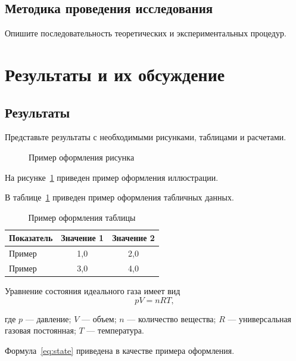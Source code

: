 \documentclass[a4paper,14pt]{extarticle}
\begin{document}
\subsection{Методика проведения исследования}
Опишите последовательность теоретических и экспериментальных процедур.

\clearpage\section{Результаты и их обсуждение}
\subsection{Результаты}
Представьте результаты с необходимыми рисунками, таблицами и расчетами.

\begin{figure}[htbp]
  \centering
  \fbox{\rule{0pt}{3cm}\rule{8cm}{0pt}}
  \caption{Пример оформления рисунка}
  \label{fig:example}
\end{figure}

На рисунке~\ref{fig:example} приведен пример оформления иллюстрации.

В таблице~\ref{tab:example} приведен пример оформления табличных данных.

\begin{table}[htbp]
  \caption{Пример оформления таблицы}
  \label{tab:example}
  \begin{tabular}{@{}lcc@{}}
    \toprule
    Показатель & Значение 1 & Значение 2 \\
    \midrule
    Пример & 1,0 & 2,0 \\
    Пример & 3,0 & 4,0 \\
    \bottomrule
  \end{tabular}
\end{table}

Уравнение состояния идеального газа имеет вид
\begin{equation}
  pV = nRT,
  \label{eq:state}
\end{equation}

где $p$ — давление; $V$ — объем; $n$ — количество вещества; $R$ — универсальная газовая постоянная; $T$ — температура.

Формула~\eqref{eq:state} приведена в качестве примера оформления.
\end{document}
